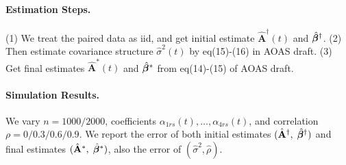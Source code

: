\documentclass[10pt]{notes}
\begin{document}
\paragraph{Estimation Steps.} (1) We treat the paired data as iid, and get initial estimate $\hat{\mathbf{A}}^\dagger(t)$ and $\hat{\bm{\beta}}^\dagger$. (2) Then estimate covariance structure $\hat{\sigma}^2(t)$ by eq(15)-(16) in AOAS draft.
(3) Get final estimates $\hat{\mathbf{A}}^*(t)$ and $\hat{\bm{\beta}}^*$ from eq(14)-(15) of AOAS draft.

\paragraph{Simulation Results.} We vary $n=1000/2000$, coefficients $\alpha_{1rs}(t),\dots,\alpha_{4rs}(t)$, and correlation $\rho=0/0.3/0.6/0.9$. We report the error of both initial estimates $(\hat{\mathbf{A}}^\dagger,\;\hat{\bm{\beta}}^\dagger)$ and final estimates $(\hat{\mathbf{A}}^*,\;\hat{\bm{\beta}}^*)$, also the error of $(\hat{\sigma}^2, \hat{\rho})$.


\clearpage

\end{document}
